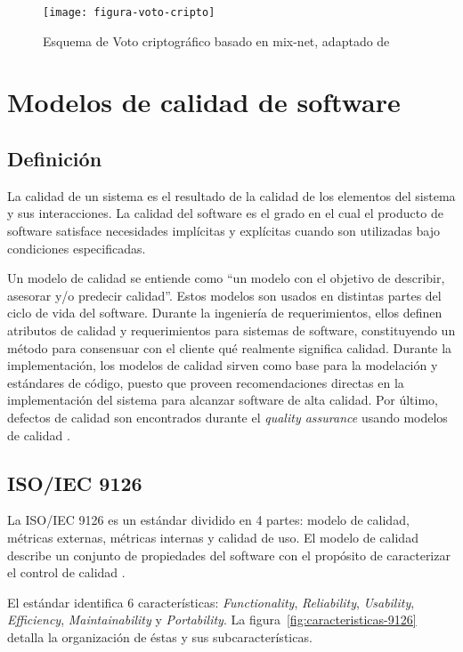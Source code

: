 \begin{figure}[h!]
	\centering
	\texttt{[image: figura-voto-cripto]}
	\caption[Esquema de Voto criptográfico basado en mix-net]{Esquema de Voto criptográfico basado en mix-net, adaptado de \cite{Adida2006}}
	\label{fig:voto-cripto}
\end{figure}

\section{Modelos de calidad de software}
\subsection{Definición}

La calidad de un sistema es el resultado de la calidad de los elementos
del sistema y sus interacciones. La calidad del software es el grado en el cual
el producto de software satisface necesidades implícitas y explícitas cuando son
utilizadas bajo condiciones especificadas. \cite{ISO/IEC2011}

Un modelo de calidad se entiende como ``un modelo con el objetivo
de describir, asesorar y/o predecir calidad''. Estos modelos son usados en distintas
partes del ciclo de vida del software. Durante la ingeniería de requerimientos, ellos
definen atributos de calidad y requerimientos para sistemas de software, constituyendo
un método para consensuar con el cliente qué realmente significa calidad. Durante la 
implementación, los modelos de calidad sirven como base para la modelación
y estándares de código, puesto que proveen recomendaciones directas en la 
implementación del sistema para alcanzar software de alta calidad. Por último, defectos
de calidad son encontrados durante el \textit{quality assurance} usando modelos 
de calidad \cite{Deissenboeck}.


\subsection{ISO/IEC 9126}

La ISO/IEC 9126 es un estándar dividido en 4 partes: modelo de calidad,
métricas externas, métricas internas y calidad de uso. El modelo de calidad
describe un conjunto de propiedades del software con el propósito de caracterizar
el control de calidad \cite{ISO/IEC2001}. 

El estándar identifica 6 características: \textit{Functionality}, \textit{Reliability}, \textit{Usability},
 \textit{Efficiency}, \textit{Maintainability} y \textit{Portability}. La figura~\ref{fig:caracteristicas-9126} detalla
la organización de éstas y sus subcaracterísticas.

